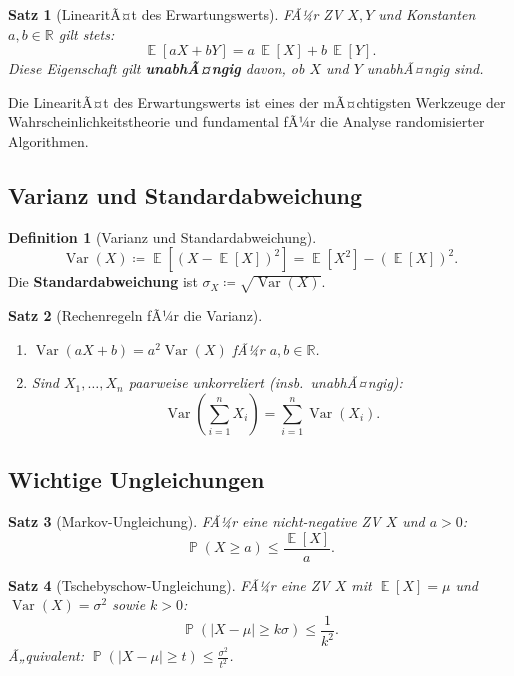 ﻿\documentclass[12pt,a4paper]{article}
\theoremstyle{definition}
\newtheorem{definition}{Definition}[section]
\theoremstyle{plain}
\newtheorem{satz}{Satz}[section]
\theoremstyle{remark}
\DeclareMathOperator{\E}{\mathbb{E}}
\DeclareMathOperator{\Var}{Var}
\DeclareMathOperator{\Prob}{\mathbb{P}}
\begin{document}
\begin{satz}[LinearitÃ¤t des Erwartungswerts]\label{satz:linear}
  FÃ¼r ZV $X, Y$ und Konstanten $a, b \in \mathbb{R}$ gilt stets:
  \[
    \E[aX + bY] = a\,\E[X] + b\,\E[Y].
  \]
  Diese Eigenschaft gilt \textbf{unabhÃ¤ngig} davon, ob $X$ und $Y$ unabhÃ¤ngig
  sind.
\end{satz}

Die LinearitÃ¤t des Erwartungswerts ist eines der mÃ¤chtigsten Werkzeuge der
Wahrscheinlichkeitstheorie und fundamental fÃ¼r die Analyse randomisierter
Algorithmen.

\subsection{Varianz und Standardabweichung}

\begin{definition}[Varianz und Standardabweichung]\label{def:var}
  \[
    \Var(X) \coloneqq \E\!\left[(X - \E[X])^2\right]
    = \E[X^2] - (\E[X])^2.
  \]
  Die \textbf{Standardabweichung} ist $\sigma_X \coloneqq \sqrt{\Var(X)}$.
\end{definition}

\begin{satz}[Rechenregeln fÃ¼r die Varianz]\label{satz:varregeln}
  \begin{enumerate}[label=(\roman*)]
    \item $\Var(aX + b) = a^2 \Var(X)$ fÃ¼r $a, b \in \mathbb{R}$.
    \item Sind $X_1, \ldots, X_n$ paarweise unkorreliert (insb.\ unabhÃ¤ngig):
      \[
        \Var\!\left(\sum_{i=1}^n X_i\right) = \sum_{i=1}^n \Var(X_i).
      \]
  \end{enumerate}
\end{satz}

\subsection{Wichtige Ungleichungen}

\begin{satz}[Markov-Ungleichung]\label{satz:markov}
  FÃ¼r eine nicht-negative ZV $X$ und $a > 0$:
  \[
    \Prob(X \geq a) \leq \frac{\E[X]}{a}.
  \]
\end{satz}

\begin{satz}[Tschebyschow-Ungleichung]\label{satz:tscheb}
  FÃ¼r eine ZV $X$ mit $\E[X] = \mu$ und $\Var(X) = \sigma^2$ sowie $k > 0$:
  \[
    \Prob\!\left(|X - \mu| \geq k\sigma\right) \leq \frac{1}{k^2}.
  \]
  Ã„quivalent: $\Prob(|X-\mu| \geq t) \leq \frac{\sigma^2}{t^2}$.
\end{satz}
\end{document}
